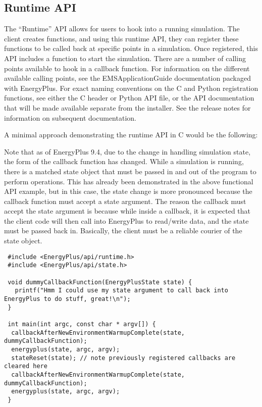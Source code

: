 \subsection{Runtime API}\label{subsec:runtime-api}

The ``Runtime'' API allows for users to hook into a running simulation.
The client creates functions, and using this runtime API, they can register these functions to be called back at specific points in a simulation.
Once registered, this API includes a function to start the simulation.
There are a number of calling points available to hook in a callback function.
For information on the different available calling points, see the EMSApplicationGuide documentation packaged with EnergyPlus.
For exact naming conventions on the C and Python registration functions, see either the C header or Python API file, or the API documentation that will be made available separate from the installer.
See the release notes for information on subsequent documentation.

A minimal approach demonstrating the runtime API in C would be the following:

Note that as of EnergyPlus 9.4, due to the change in handling simulation state, the form of the callback function has changed.
While a simulation is running, there is a matched state object that must be passed in and out of the program to perform operations.
This has already been demonstrated in the above functional API example, but in this case, the state change is more pronounced because the callback function must accept a state argument.
The reason the callback must accept the state argument is because while inside a callback, it is expected that the client code will then call into EnergyPlus to read/write data, and the state must be passed back in.
Basically, the client must be a reliable courier of the state object.

\begin{lstlisting}
 #include <EnergyPlus/api/runtime.h>
 #include <EnergyPlus/api/state.h>

 void dummyCallbackFunction(EnergyPlusState state) {
   printf("Hmm I could use my state argument to call back into EnergyPlus to do stuff, great!\n");
 }

 int main(int argc, const char * argv[]) {
  callbackAfterNewEnvironmentWarmupComplete(state, dummyCallbackFunction);
  energyplus(state, argc, argv);
  stateReset(state); // note previously registered callbacks are cleared here
  callbackAfterNewEnvironmentWarmupComplete(state, dummyCallbackFunction);
  energyplus(state, argc, argv);
 }
\end{lstlisting}

